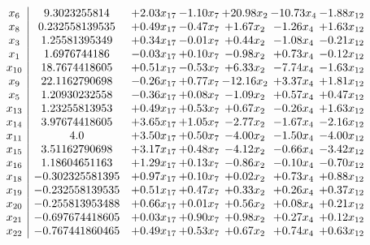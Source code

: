 \documentclass[8pt]{article}
\begin{document}
\[\begin{array}{c| c c@{\hskip 2pt} c@{\hskip 2pt} c@{\hskip 2pt} c@{\hskip 2pt} c@{\hskip 2pt} }
 x_{6}   &  9.3023255814 & +  2.03 x_{17} & -1.10 x_{7} & + 20.98 x_{2} & -10.73 x_{4} & -1.88 x_{12}\\
 x_{8}   &  0.232558139535 & +  0.49 x_{17} & -0.47 x_{7} & +  1.67 x_{2} & -1.26 x_{4} & +  1.63 x_{12}\\
 x_{3}   &  1.25581395349 & +  0.34 x_{17} & -0.01 x_{7} & +  0.44 x_{2} & -1.08 x_{4} & -0.21 x_{12}\\
 x_{1}   &  1.6976744186 & -0.03 x_{17} & +  0.10 x_{7} & -0.98 x_{2} & +  0.73 x_{4} & -0.12 x_{12}\\
 x_{10}   &  18.7674418605 & +  0.51 x_{17} & -0.53 x_{7} & +  6.33 x_{2} & -7.74 x_{4} & -1.63 x_{12}\\
 x_{9}   &  22.1162790698 & -0.26 x_{17} & +  0.77 x_{7} & -12.16 x_{2} & +  3.37 x_{4} & +  1.81 x_{12}\\
 x_{5}   &  1.20930232558 & -0.36 x_{17} & +  0.08 x_{7} & -1.09 x_{2} & +  0.57 x_{4} & +  0.47 x_{12}\\
 x_{13}   &  1.23255813953 & +  0.49 x_{17} & +  0.53 x_{7} & +  0.67 x_{2} & -0.26 x_{4} & +  1.63 x_{12}\\
 x_{14}   &  3.97674418605 & +  3.65 x_{17} & +  1.05 x_{7} & -2.77 x_{2} & -1.67 x_{4} & -2.16 x_{12}\\
 x_{11}   &  4.0 & +  3.50 x_{17} & +  0.50 x_{7} & -4.00 x_{2} & -1.50 x_{4} & -4.00 x_{12}\\
 x_{15}   &  3.51162790698 & +  3.17 x_{17} & +  0.48 x_{7} & -4.12 x_{2} & -0.66 x_{4} & -3.42 x_{12}\\
 x_{16}   &  1.18604651163 & +  1.29 x_{17} & +  0.13 x_{7} & -0.86 x_{2} & -0.10 x_{4} & -0.70 x_{12}\\
 x_{18}   &  -0.302325581395 & +  0.97 x_{17} & +  0.10 x_{7} & +  0.02 x_{2} & +  0.73 x_{4} & +  0.88 x_{12}\\
 x_{19}   &  -0.232558139535 & +  0.51 x_{17} & +  0.47 x_{7} & +  0.33 x_{2} & +  0.26 x_{4} & +  0.37 x_{12}\\
 x_{20}   &  -0.255813953488 & +  0.66 x_{17} & +  0.01 x_{7} & +  0.56 x_{2} & +  0.08 x_{4} & +  0.21 x_{12}\\
 x_{21}   &  -0.697674418605 & +  0.03 x_{17} & +  0.90 x_{7} & +  0.98 x_{2} & +  0.27 x_{4} & +  0.12 x_{12}\\
 x_{22}   &  -0.767441860465 & +  0.49 x_{17} & +  0.53 x_{7} & +  0.67 x_{2} & +  0.74 x_{4} & +  0.63 x_{12}\\

\end{array}\]
\end{document}
